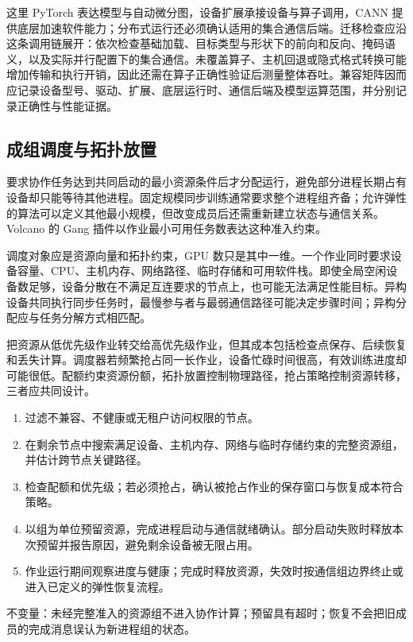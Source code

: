 \documentclass[../textbook.tex]{subfiles}
\begin{document}
这里 PyTorch 表达模型与自动微分图，设备扩展承接设备与算子调用，CANN 提供底层加速软件能力；分布式运行还必须确认适用的集合通信后端。迁移检查应沿这条调用链展开：依次检查基础加载、目标类型与形状下的前向和反向、掩码语义，以及实际并行配置下的集合通信。未覆盖算子、主机回退或隐式格式转换可能增加传输和执行开销，因此还需在算子正确性验证后测量整体吞吐。兼容矩阵因而应记录设备型号、驱动、扩展、底层运行时、通信后端及模型运算范围，并分别记录正确性与性能证据。

\subsection{成组调度与拓扑放置}
要求协作任务达到共同启动的最小资源条件后才分配运行，避免部分进程长期占有设备却只能等待其他进程。固定规模同步训练通常要求整个进程组齐备；允许弹性的算法可以定义其他最小规模，但改变成员后还需重新建立状态与通信关系。Volcano 的 Gang 插件以作业最小可用任务数表达这种准入约束。\cite{volcano2026gang}

调度对象应是资源向量和拓扑约束，GPU 数只是其中一维。一个作业同时要求设备容量、CPU、主机内存、网络路径、临时存储和可用软件栈。即使全局空闲设备数足够，设备分散在不满足互连要求的节点上，也可能无法满足性能目标。异构设备共同执行同步任务时，最慢参与者与最弱通信路径可能决定步骤时间；异构分配应与任务分解方式相匹配。

把资源从低优先级作业转交给高优先级作业，但其成本包括检查点保存、后续恢复和丢失计算。调度器若频繁抢占同一长作业，设备忙碌时间很高，有效训练进度却可能很低。配额约束资源份额，拓扑放置控制物理路径，抢占策略控制资源转移，三者应共同设计。

\begin{algorithm}[协作作业的资源准入]
\begin{enumerate}
\item 过滤不兼容、不健康或无租户访问权限的节点。
\item 在剩余节点中搜索满足设备、主机内存、网络与临时存储约束的完整资源组，并估计跨节点关键路径。
\item 检查配额和优先级；若必须抢占，确认被抢占作业的保存窗口与恢复成本符合策略。
\item 以组为单位预留资源，完成进程启动与通信就绪确认。部分启动失败时释放本次预留并报告原因，避免剩余设备被无限占用。
\item 作业运行期间观察进度与健康；完成时释放资源，失效时按通信组边界终止或进入已定义的弹性恢复流程。
\end{enumerate}
不变量：未经完整准入的资源组不进入协作计算；预留具有超时；恢复不会把旧成员的完成消息误认为新进程组的状态。
\end{algorithm}
\end{document}
